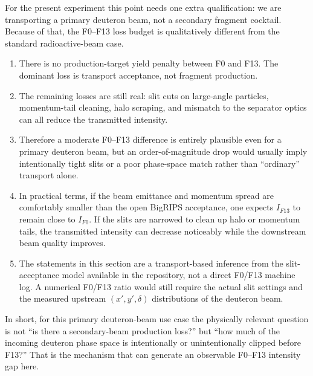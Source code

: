 \documentclass[11pt,a4paper]{article}
\begin{document}
For the present experiment this point needs one extra qualification: we are transporting a primary deuteron beam, not a secondary fragment cocktail. Because of that, the F0--F13 loss budget is qualitatively different from the standard radioactive-beam case.
\begin{enumerate}
    \item There is no production-target yield penalty between F0 and F13. The dominant loss is transport acceptance, not fragment production.
    \item The remaining losses are still real: slit cuts on large-angle particles, momentum-tail cleaning, halo scraping, and mismatch to the separator optics can all reduce the transmitted intensity.
    \item Therefore a moderate F0--F13 difference is entirely plausible even for a primary deuteron beam, but an order-of-magnitude drop would usually imply intentionally tight slits or a poor phase-space match rather than ``ordinary'' transport alone.
    \item In practical terms, if the beam emittance and momentum spread are comfortably smaller than the open BigRIPS acceptance, one expects $I_{F13}$ to remain close to $I_{F0}$. If the slits are narrowed to clean up halo or momentum tails, the transmitted intensity can decrease noticeably while the downstream beam quality improves.
    \item The statements in this section are a transport-based inference from the slit-acceptance model available in the repository, not a direct F0/F13 machine log. A numerical F0/F13 ratio would still require the actual slit settings and the measured upstream $(x',y',\delta)$ distributions of the deuteron beam.
    \end{enumerate}

In short, for this primary deuteron-beam use case the physically relevant question is not ``is there a secondary-beam production loss?'' but ``how much of the incoming deuteron phase space is intentionally or unintentionally clipped before F13?'' That is the mechanism that can generate an observable F0--F13 intensity gap here.




\end{document}
